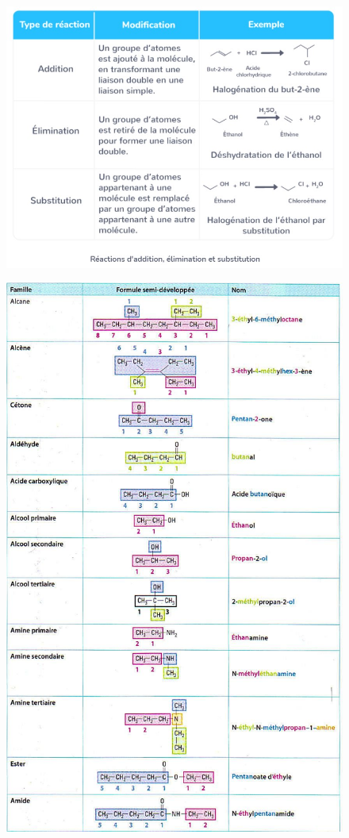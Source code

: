 \documentclass[11pt,a4paper]{article}
\begin{document}
\begin{figure}[H]
    \centering
    \includegraphics[width=0.95\linewidth]{imgs/c5/catRX.jpg}
\end{figure}

\begin{figure}[H]
    \centering
    \includegraphics[width=.9\linewidth]{imgs/c5/recapgroupes.jpg}
\end{figure}
\end{document}

